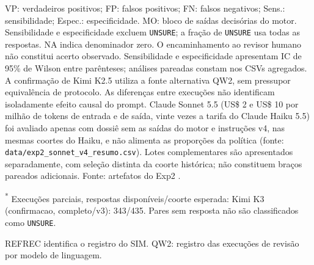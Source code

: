 \begin{table}[!ht]
\parbox{\linewidth}{\footnotesize VP: verdadeiros positivos; FP: falsos positivos; FN: falsos negativos; Sens.: sensibilidade; Espec.: especificidade. MO: bloco de saídas decisórias do motor. Sensibilidade e especificidade excluem \texttt{UNSURE}; a fração de \texttt{UNSURE} usa todas as respostas. NA indica denominador zero. O encaminhamento ao revisor humano não constitui acerto observado. Sensibilidade e especificidade apresentam IC de 95\% de Wilson entre parênteses; análises pareadas constam nos CSVs agregados. A confirmação de Kimi K2.5 utiliza a fonte alternativa QW2, sem pressupor equivalência de protocolo. As diferenças entre execuções não identificam isoladamente efeito causal do prompt. Claude Sonnet 5.5 (US\$ 2 e US\$ 10 por milhão de tokens de entrada e de saída, vinte vezes a tarifa do Claude Haiku 5.5) foi avaliado apenas com dossiê sem as saídas do motor e instruções v4, nas mesmas coortes do Haiku, e não alimenta as proporções da política (fonte: \texttt{data/exp2\_sonnet\_v4\_resumo.csv}). Lotes complementares são apresentados separadamente, com seleção distinta da coorte histórica; não constituem braços pareados adicionais. Fonte: artefatos do Exp2 \cite{Jardim2026phdrepo}.}
\par\smallskip
\parbox{\linewidth}{\footnotesize\textsuperscript{*} Execuções parciais, respostas disponíveis/coorte esperada: Kimi K3 (confirmacao, completo/v3): 343/435. Pares sem resposta não são classificados como \texttt{UNSURE}.}
\par\footnotesize REFREC identifica o registro do SIM. QW2: registro das execuções de revisão por modelo de linguagem.
\end{table}

